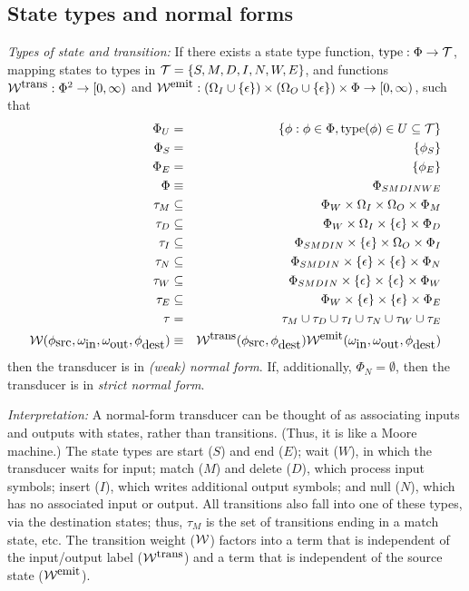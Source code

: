 \documentclass{article}
\newcommand\gappedalphabet[1]{(\Omega_{#1} \cup \{\epsilon\})}
\newcommand\gappedpair[2]{\gappedalphabet{#1} \times \gappedalphabet{#2}}
\newcommand\States{\Phi}
\newcommand\Transitions{\tau}
\newcommand\startstate{\phi_S}
\newcommand\laststate{\phi_E}
\newcommand\weight{{\cal W}}
\newcommand\weightfunof[1]{\weight_{#1}}
\newcommand\transweightfun[1]{\weightfunof{#1}^{\mbox{\small trans}}}
\newcommand\emitweightfun[1]{\weightfunof{#1}^{\mbox{\small emit}}}
\newcommand\statesoftype[1]{\States_{#1}}
\newcommand\statetype{\mbox{type}}
\begin{document}
\subsection{State types and normal forms}
{\em Types of state and transition:}
If there exists a state type function, $\statetype:\States \to {\cal T}$, mapping states to types in ${\cal T} = \{S,M,D,I,N,W,E\}$,
and functions $\transweightfun{}: \States^2 \to [0,\infty)$ and $\emitweightfun{}: \gappedpair{I}{O} \times \States \to [0,\infty)$,
such that
\begin{eqnarray*}
\States_U & = & \{ \phi: \phi\in\States, \statetype(\phi) \in U \subseteq {\cal T} \} \\
\statesoftype{S} & = & \{ \startstate \} \\
\statesoftype{E} & = & \{ \laststate \} \\
\States & \equiv & \statesoftype{SMDINWE} \\   
\Transitions_M & \subseteq & \statesoftype{W} \times \Omega_I \times \Omega_O \times \statesoftype{M} \\
\Transitions_D & \subseteq & \statesoftype{W} \times \Omega_I \times \{\epsilon\} \times \statesoftype{D} \\
\Transitions_I & \subseteq & \statesoftype{SMDIN} \times \{\epsilon\} \times \Omega_O \times \statesoftype{I} \\
\Transitions_N & \subseteq & \statesoftype{SMDIN} \times \{\epsilon\} \times \{\epsilon\} \times \statesoftype{N} \\
\Transitions_W & \subseteq & \statesoftype{SMDIN} \times \{\epsilon\} \times \{\epsilon\} \times \statesoftype{W} \\
\Transitions_E & \subseteq & \statesoftype{W} \times \{\epsilon\} \times \{\epsilon\} \times \statesoftype{E} \\
\Transitions & = & \Transitions_M \cup \Transitions_D \cup \Transitions_I \cup \Transitions_N \cup \Transitions_W \cup \Transitions_E \\
\weight(\phi_{\mbox{src}},\omega_{\mbox{in}},\omega_{\mbox{out}},\phi_{\mbox{dest}}) & \equiv & \transweightfun{}(\phi_{\mbox{src}},\phi_{\mbox{dest}}) \emitweightfun{}(\omega_{\mbox{in}},\omega_{\mbox{out}},\phi_{\mbox{dest}})
\end{eqnarray*}
then the transducer is in {\em (weak) normal form}.
If, additionally, $\statesoftype{N} = \emptyset$, then the transducer is in {\em strict normal form}.

{\em Interpretation:}
A normal-form transducer can be thought of as associating inputs and outputs with states, rather than transitions.
(Thus, it is like a Moore machine.)
The state types are
 start ($S$) and end ($E$);
 wait ($W$), in which the transducer waits for input;
 match ($M$) and delete ($D$), which process input symbols;
 insert ($I$), which writes additional output symbols; and
 null ($N$), which has no associated input or output.
All transitions also fall into one of these types, via the destination states;
thus, $\Transitions_M$ is the set of transitions ending in a match state, etc.
The transition weight ($\weight$) factors into a term that is independent of the input/output label ($\transweightfun{}$)
and a term that is independent of the source state ($\emitweightfun{}$).
\end{document}
